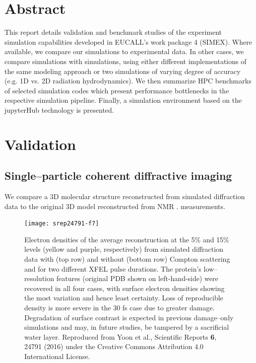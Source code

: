 \documentclass[10pt]{scrartcl}
\begin{document}
\section*{Abstract}
%
This report details validation and benchmark studies of the experiment simulation capabilities
developed in EUCALL's work package 4 (SIMEX). Where available, we compare our
simulations to experimental data. In other cases, we compare simulations with
simulations, using either different implementations of the same modeling
approach or two simulations of varying degree of accuracy (e.g. 1D vs. 2D
radiation hydrodynamics). We then summarize HPC benchmarks of selected
simulation codes which present performance bottlenecks in the respective
simulation pipeline. Finally, a simulation environment based on the jupyterHub
technology is presented.
%
\tableofcontents
%
\section{Validation}%
\subsection{Single--particle coherent diffractive imaging\label{sec:single_particle_imaging}}
We compare a 3D molecular structure reconstructed from simulated diffraction data
to the original 3D model reconstructed from NMR \cite{Schlessman1998}.
measurements.
%
\begin{figure}[ht]
  \begin{center}
    \texttt{[image: srep24791-f7]}
  \end{center}
  \caption{Electron densities of the average reconstruction at the 5\% and 15\%
    levels (yellow and purple, respectively) from simulated diffraction data with
    (top row) and without (bottom row) Compton scattering and for two different
    XFEL pulse durations. The protein's low--resolution features (original PDB
    shown on left-hand-side) were recovered in
    all four cases, with surface electron densities showing the most variation and
    hence least certainty. Loss of reproducible density is more severe in the
    30 fs case due to greater damage. Degradation of surface contrast is
    expected in
    previous damage--only simulations and may, in future studies, be tampered by a
    sacrificial water layer\cite{Hau-Riege2004}. Reproduced
    from Yoon et al., Scientific Reports \textbf{6}, 24791 (2016) under the
    Creative Commons Attribution 4.0 International License.
  }
  \label{fig:2NIP_reconstruction}
\end{figure}
\end{document}
